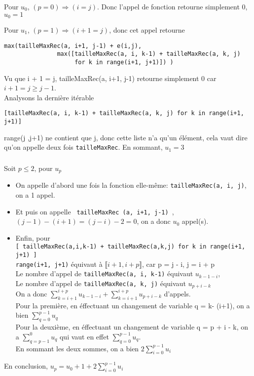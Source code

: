 \documentclass[french]{article}
\begin{document}
\subsubsection{}
Pour $u_{0}$, $(p = 0) \Rightarrow (i = j)$. Donc l'appel de fonction retourne simplement 0, $u_{0}=1$ \par
Pour $u_{1}$, $(p = 1) \Rightarrow (i + 1 = j)$, donc cet appel retourne 
\begin{lstlisting}
max(tailleMaxRec(a, i+1, j-1) + e(i,j),
               max([tailleMaxRec(a, i, k-1) + tailleMaxRec(a, k, j)
                    for k in range(i+1, j+1)]) )\end{lstlisting}
Vu que i + 1 = j,  tailleMaxRec(a, i+1, j-1) retourne simplement 0 car $i+1=j\geq j-1$.\\
Analysons la dernière itérable 
\begin{lstlisting}
[tailleMaxRec(a, i, k-1) + tailleMaxRec(a, k, j) for k in range(i+1, j+1)]\end{lstlisting}
range(j ,j+1) ne contient que j, donc cette liste n'a qu'un élément, cela vaut dire qu'on appelle deux fois  \lstinline{tailleMaxRec}.
En sommant, $u_{1} = 3$
\subsubsection{}

Soit $p \leq 2$, pour $u_{p}$\\
	\begin{itemize}
	\item
	On appelle d'abord une fois la fonction elle-même: \lstinline{tailleMaxRec(a, i, j)}, on a 1 appel. 
	\item
	Et puis on appelle  \lstinline{ tailleMaxRec (a, i+1, j-1) },\\
	 $(j-1)-(i+1)=(j-i)-2=0$, on a donc $u_{0}$ appel(s).
	\item
	Enfin, pour\\
 \lstinline{[ tailleMaxRec(a,i,k-1) + tailleMaxRec(a,k,j) for k in range(i+1, j+1) ]}\\
	\lstinline{range(i+1, j+1)} équivaut à $\llbracket i+1, i+p \rrbracket$, car p = j - i, j = i + p\\
Le nombre d'appel de \lstinline{tailleMaxRec(a, i, k-1)} équivaut $u_{k-1-i}$,\\Le nombre d'appel de \lstinline{tailleMaxRec(a, k, j)} équivaut $u_{p+i-k}$\\	
On a donc $\sum_{k=i+1}^{i+p} u_{k-1-i} + \sum_{k=i+1}^{i+p} u_{p+i-k}$ d'appels.\\
Pour la première, en éffectuant un changement de variable q = k- (i+1), on a bien $\sum_{q=0}^{p-1} u_{q}$\\
Pour la deuxième, en éffectuant un changement de variable q = p + i - k, on a  $\sum_{q=p-1}^{0} u_{q}$ qui vaut en effet $\sum_{q=0}^{p-1} u_{q}$.\\
En sommant les deux sommes, on a bien $2\sum_{i=0}^{p-1} u_{i}$
	\end{itemize}
\par
En conclusion, $u_{p}=u_{0}+1+2\sum_{i=0}^{p-1} u_{i}$
\end{document}
